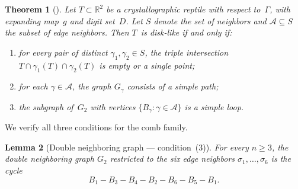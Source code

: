 \documentclass{amsart}
\newtheorem{theorem}{Theorem}[section]
\newtheorem{lemma}[theorem]{Lemma}
\theoremstyle{definition}
\theoremstyle{remark}
\newcommand{\R}{\mathbb{R}}
\begin{document}
\begin{theorem}[{\cite[Theorem~4.2]{loridant-luo-thuswaldner}}]%
\label{thm:disklike-criterion}
Let $T \subset \R^2$ be a crystallographic reptile with respect
to~$\Gamma$, with expanding map~$g$ and digit set~$D$.
Let $S$ denote the set of neighbors and $\mathcal{A} \subseteq S$ the
subset of edge neighbors.  Then $T$~is disk-like if and only if:
\begin{enumerate}
\item[\rm(1)] for every pair of distinct $\gamma_1, \gamma_2 \in S$,
  the triple intersection
  $T \cap \gamma_1(T) \cap \gamma_2(T)$ is empty or a single point;
\item[\rm(2)] for each $\gamma \in \mathcal{A}$, the graph $G_\gamma$
  consists of a simple path;
\item[\rm(3)] the subgraph of~$G_2$ with
  vertices $\{B_\gamma : \gamma \in \mathcal{A}\}$ is a simple loop.
\end{enumerate}
\end{theorem}

We verify all three conditions for the comb family.

\begin{lemma}[Double neighboring graph — condition~(3)]%
\label{lem:simple-loop}
For every $n \ge 3$, the double neighboring graph $G_2$ restricted to
the six edge neighbors $\sigma_1, \ldots, \sigma_6$ is the cycle
\[
  B_1 - B_3 - B_4 - B_2 - B_6 - B_5 - B_1.
\]
\end{lemma}
\end{document}
